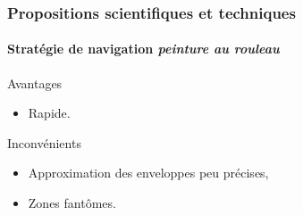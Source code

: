 \documentclass{beamer}
\begin{document}
			\begin{frame}
				\frametitle{Propositions scientifiques et techniques}
				\framesubtitle{Stratégie de navigation \textit{peinture au rouleau}}
				\begin{exampleblock}{Avantages}
					\begin{itemize}
						\item Rapide.
					\end{itemize}
				\end{exampleblock}
				\begin{alertblock}{Inconvénients}
					\begin{itemize}
						\item Approximation des enveloppes peu précises,
						\item Zones fantômes.
					\end{itemize}
				\end{alertblock}
			\end{frame}
\end{document}
